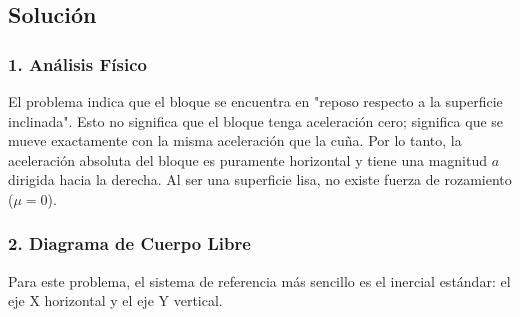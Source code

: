 \documentclass[12pt, a4paper]{article}
\begin{document}
\begin{center}
\end{center}

\subsection*{Solución}

\subsubsection*{1. Análisis Físico}
El problema indica que el bloque se encuentra en "reposo respecto a la superficie inclinada". Esto no significa que el bloque tenga aceleración cero; significa que se mueve exactamente con la misma aceleración que la cuña.
Por lo tanto, la aceleración absoluta del bloque es puramente horizontal y tiene una magnitud $a$ dirigida hacia la derecha.
Al ser una superficie lisa, no existe fuerza de rozamiento ($\mu = 0$).

\subsubsection*{2. Diagrama de Cuerpo Libre}
Para este problema, el sistema de referencia más sencillo es el inercial estándar: el eje X horizontal y el eje Y vertical.
\end{document}

